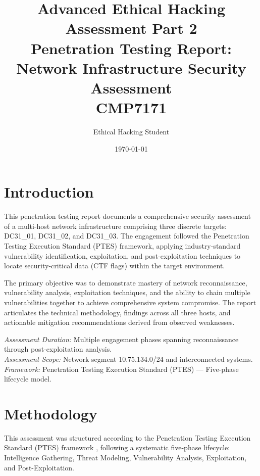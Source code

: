 \documentclass[11pt,a4paper]{article}
\title{%
    \textbf{Advanced Ethical Hacking Assessment Part 2}\\
    \large Penetration Testing Report: Network Infrastructure Security Assessment\\
    \normalsize CMP7171
}
\author{Ethical Hacking Student}
\date{\today}
\begin{document}
\maketitle

\newpage
\tableofcontents
\newpage


\section{Introduction}

This penetration testing report documents a comprehensive security assessment of a multi-host network infrastructure comprising three discrete targets: DC31\_01, DC31\_02, and DC31\_03. The engagement followed the Penetration Testing Execution Standard (PTES) framework, applying industry-standard vulnerability identification, exploitation, and post-exploitation techniques to locate security-critical data (CTF flags) within the target environment.

The primary objective was to demonstrate mastery of network reconnaissance, vulnerability analysis, exploitation techniques, and the ability to chain multiple vulnerabilities together to achieve comprehensive system compromise. The report articulates the technical methodology, findings across all three hosts, and actionable mitigation recommendations derived from observed weaknesses.

\textit{Assessment Duration:} Multiple engagement phases spanning reconnaissance through post-exploitation analysis.\\
\textit{Assessment Scope:} Network segment 10.75.134.0/24 and interconnected systems.\\
\textit{Framework:} Penetration Testing Execution Standard (PTES) — Five-phase lifecycle model.


\section{Methodology}

This assessment was structured according to the Penetration Testing Execution Standard (PTES) framework \citep{PTES2014}, following a systematic five-phase lifecycle: Intelligence Gathering, Threat Modeling, Vulnerability Analysis, Exploitation, and Post-Exploitation.
\end{document}
